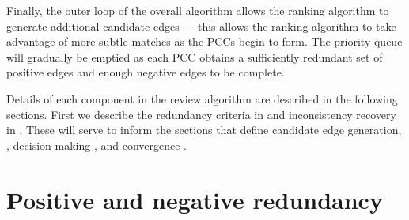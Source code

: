 Finally, the outer loop of the overall algorithm allows the ranking algorithm to generate additional candidate edges ---
this allows the ranking algorithm to take advantage of more subtle matches as the PCCs begin to form. The priority queue
will gradually be emptied as each PCC obtains a sufficiently redundant set of positive edges and enough negative edges
to be complete.

Details of each component in the review algorithm are described in the
following sections.  First we describe the redundancy criteria in
 and inconsistency recovery in . These will
serve to inform the sections that
define candidate edge generation, , decision making
,  and convergence .


\section{Positive and negative redundancy}\label{sec:redun}

